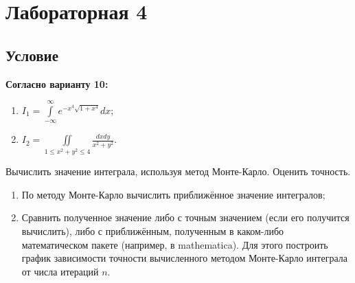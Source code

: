 \section{Лабораторная 4}

\subsection{Условие}

\textbf{Согласно варианту 10:}
\begin{enumerate}
	\item $I_{1} = \int\limits_{-\infty}^{\infty} e^{-x^{4} \sqrt{1+x^{4}}} dx$;
	\item $I_{2} = \iint\limits_{1 \leqslant x^{2} + y^{2} \leqslant 4} \frac{dxdy}{x^{2} + y^{2}}$.
\end{enumerate}

Вычислить значение интеграла, используя метод Монте-Карло. Оценить точность.

\begin{enumerate}
	\item По методу Монте-Карло вычислить приближённое значение интегралов;
	\item Сравнить полученное значение либо с точным значением (если его получится вычислить), либо с приближённым, полученным в каком-либо математическом пакете (например, в mathematica). Для этого построить график зависимости точности вычисленного методом Монте-Карло интеграла от числа итераций $n$.
\end{enumerate}

